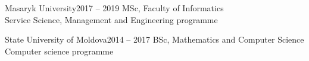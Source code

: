 \documentclass[12pt, a4paper]{article}
\begin{document}
\begin{minipage}[t]{0.6\textwidth}
    
    \begin{subsec}{Masaryk University}{2017 – 2019}
        \> MSc, Faculty of Informatics \\
        \> Service Science, Management and Engineering programme \\
    \end{subsec}
    
    \begin{subsec}{State University of Moldova}{2014 – 2017}
        \> BSc, Mathematics and Computer Science \\
        \> Computer science programme \\
    \end{subsec}
\end{minipage}
\end{document}
